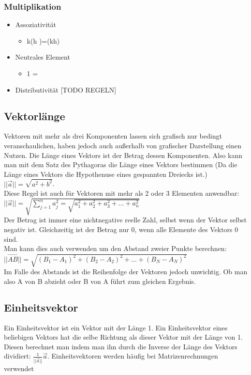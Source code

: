 \documentclass{article}
\begin{document}
	\subsubsection{Multiplikation}
	\begin{itemize}
		\item{Assoziativität}
		\begin{itemize}
			\item{k(h \vec{a})=(kh)}
		\end{itemize}
		\item{Neutrales Element}
		\begin{itemize}
			\item{1 =}
		\end{itemize}
		\item{Distributivität}
		[TODO REGELN]
	\end{itemize}
	\subsection{Vektorlänge}
	Vektoren mit mehr als drei Komponenten lassen sich grafisch nur bedingt veranschaulichen, haben jedoch auch außerhalb von grafischer Darstellung einen Nutzen. Die Länge eines Vektors ist der Betrag dessen Komponenten. Also kann man mit dem Satz des Pythagoras die Länge eines Vektors bestimmen (Da die Länge eines Vektors die Hypothenuse eines gespannten Dreiecks ist.) $||||=\sqrt{a^2+b^2}$. \\
	Diese Regel ist auch für Vektoren mit mehr als 2 oder 3 Elementen anwendbar: $||\vec{a}||=\sqrt{\sum_{j=1}^{n}a_j^2=\sqrt{a_1^2+a_2^2+a_3^2+...+a_n^2}}$ \\
	Der Betrag ist immer eine nichtnegative reelle Zahl, selbst wenn der Vektor selbst negativ ist. Gleichzeitig ist der Betrag nur 0, wenn alle Elemente des Vektors 0 sind. \\
	Man kann dies auch verwenden um den Abstand zweier Punkte berechnen: $||\overrightarrow{AB}||=\sqrt{(B_1-A_1)^2+(B_2-A_2)^2+...+(B_N-A_N)^2}$ \\
	Im Falle des Abstands ist die Reihenfolge der Vektoren jedoch unwichtig. Ob man also A von B abzieht oder B von A führt zum gleichen Ergebnis.
	\subsection{Einheitsvektor}
	Ein Einheitsvektor ist ein Vektor mit der Länge 1. Ein Einheitsvektor eines beliebigen Vektors hat die selbe Richtung als dieser Vektor mit der Länge von 1. Diesen berechnet man indem man ihn durch die Inverse der Länge des Vektors dividiert: ${\frac{1}{||\vec{a}||}\vec{a}}$. Einheitsvektoren werden häufig bei Matrizenrechnungen verwendet
\end{document}
